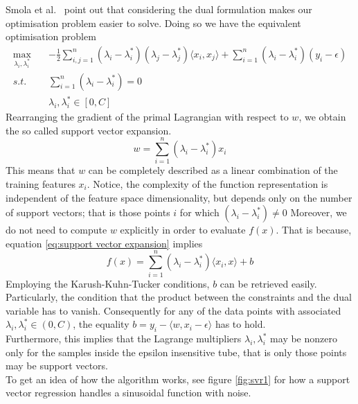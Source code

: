 Smola et al.\ \cite{smola2004tutorial} point out that considering the dual formulation makes our optimisation problem easier to solve. Doing so we have the equivalent optimisation problem
\begin{equation}
    \begin{aligned}
        \max_{\lambda_i, \lambda_i^*} \quad& -\frac{1}{2}\sum\limits_{i,j=1}^n(\lambda_i-\lambda_i^*)(\lambda_j-\lambda_j^*)\langle x_i,x_j\rangle +\sum\limits_{i=1}^n(\lambda_i-\lambda_i^*)(y_i-\epsilon)
        \\
        s.t. \quad& \sum\limits_{i=1}^n(\lambda_i-\lambda_i^*)=0
        \\
        \quad& \lambda_i, \lambda_i^* \in [0, C]
    \end{aligned}
\end{equation}
Rearranging the gradient of the primal Lagrangian with respect to $w$, we obtain the so called support vector expansion.
\begin{equation}\label{eq:support vector expansion}
    w=\sum\limits_{i=1}^n(\lambda_i-\lambda_i^*)x_i
\end{equation}
This means that $w$ can be completely described as a linear combination of the training features $x_i$.
Notice, the complexity of the function representation is independent of the feature space dimensionality, but depends only on the number of support vectors; that is those points $i$ for which $(\lambda_i-\lambda_i^*)\neq 0$
Moreover, we do not need to compute $w$ explicitly in order to evaluate $f(x)$.
That is because, equation \ref{eq:support vector expansion} implies
\begin{equation}
    f(x)=\sum\limits_{i=1}^n(\lambda_i-\lambda_i^*)\langle x_i, x\rangle +b
\end{equation}
Employing the Karush-Kuhn-Tucker conditions, $b$ can be retrieved easily. Particularly, the condition that the product between the constraints and the dual variable has to vanish.
Consequently for any of the data points with associated $\lambda_i, \lambda^*_i \in (0,C)$, the equality $b=y_i-\langle w, x_i-\epsilon\rangle$ has to hold.
\\
Furthermore, this implies that the Lagrange multipliers $\lambda_i, \lambda_i^*$ may be nonzero only for the samples inside the epsilon insensitive tube, that is only those points may be support vectors. 
\\
To get an idea of how the algorithm works, see figure \ref{fig:svr1} for how a support vector regression handles a sinusoidal function with noise.
\\
